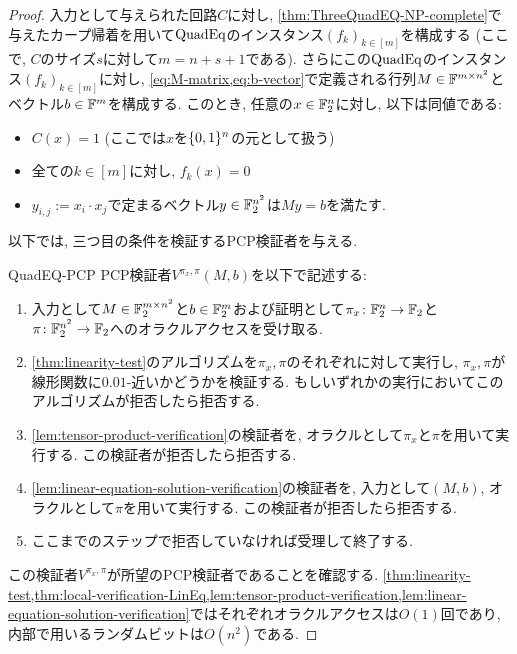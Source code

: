   \begin{proof}
    入力として与えられた回路$C$に対し, \cref{thm:ThreeQuadEQ-NP-complete}で与えたカープ帰着を用いて$\text{QuadEq}$のインスタンス$(f_k)_{k\in [m]}$を構成する (ここで, $C$のサイズ$s$に対して$m=n+s+1$である).
    さらにこの$\text{QuadEq}$のインスタンス$(f_k)_{k\in[m]}$に対し, \cref{eq:M-matrix,eq:b-vector}で定義される行列$M\in\mathbb{F}^{m\times n^2}$とベクトル$b\in\mathbb{F}^m$を構成する.
    このとき, 任意の$x\in\mathbb{F}_2^n$に対し, 以下は同値である:
    \begin{itemize}
      \item $C(x)=1$ (ここでは$x$を$\{0,1\}^n$の元として扱う)
      \item 全ての$k\in[m]$に対し, $f_k(x)=0$
      \item $y_{i,j}:=x_i\cdot x_j$で定まるベクトル$y\in\mathbb{F}_2^{n^2}$は$My=b$を満たす.
    \end{itemize}
  
    以下では, 三つ目の条件を検証するPCP検証者を与える.

    \begin{algo}{}{QuadEQ-PCP}
      PCP検証者$V^{\pi_x,\pi}(M,b)$を以下で記述する:
      \begin{enumerate}
        \item 入力として$M\in\mathbb{F}_2^{m\times n^2}$と$b\in\mathbb{F}_2^m$および証明として$\pi_x\colon\mathbb{F}_2^n\to\mathbb{F}_2$と$\pi\colon\mathbb{F}_2^{n^2}\to\mathbb{F}_2$へのオラクルアクセスを受け取る.
        \item \cref{thm:linearity-test}のアルゴリズムを$\pi_x,\pi$のそれぞれに対して実行し, $\pi_x,\pi$が線形関数に$0.01$-近いかどうかを検証する. もしいずれかの実行においてこのアルゴリズムが拒否したら拒否する.
        \item \cref{lem:tensor-product-verification}の検証者を, オラクルとして$\pi_x$と$\pi$を用いて実行する. この検証者が拒否したら拒否する.
        \item \cref{lem:linear-equation-solution-verification}の検証者を, 入力として$(M,b)$, オラクルとして$\pi$を用いて実行する. この検証者が拒否したら拒否する.
        \item ここまでのステップで拒否していなければ受理して終了する.
      \end{enumerate}
    \end{algo}

    この検証者$V^{\pi_x,\pi}$が所望のPCP検証者であることを確認する.
    \cref{thm:linearity-test,thm:local-verification-LinEq,lem:tensor-product-verification,lem:linear-equation-solution-verification}ではそれぞれオラクルアクセスは$O(1)$回であり, 内部で用いるランダムビットは$O(n^2)$である.


\end{proof}
